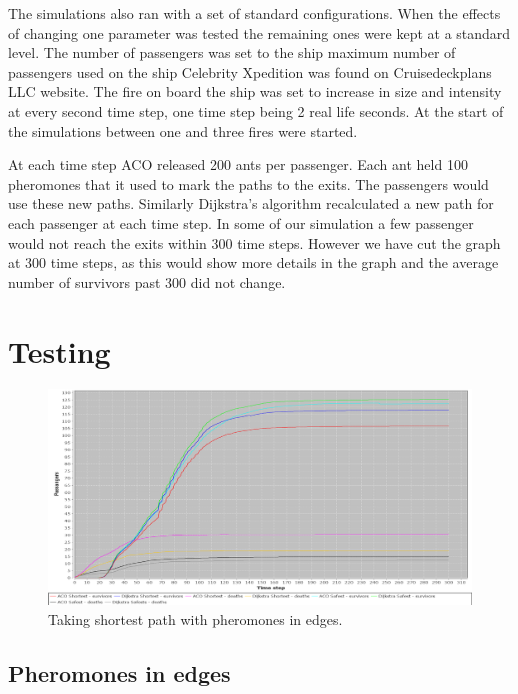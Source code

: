 The simulations also ran with a set of standard configurations. When the effects of changing one parameter was tested the remaining ones were kept at a standard level. The number of passengers was set to the ship maximum number of passengers used on the ship Celebrity Xpedition was found on Cruisedeckplans LLC website\cite{cruseships}. The fire on board the ship was set to increase in size and intensity at every second time step, one time step being 2 real life seconds. At the start of the simulations between one and three fires were started.

At each time step ACO released 200 ants per passenger. Each ant held 100 pheromones that it used to mark the paths to the exits. The passengers would use these new paths. Similarly Dijkstra's algorithm recalculated a new path for each passenger at each time step. In some of our simulation a few passenger would not reach the exits within 300 time steps. However we have cut the graph at 300 time steps, as this would show more details in the graph and the average number of survivors past 300 did not change. 


\section{Testing}

\begin{figure} [h]
\centering
\hspace*{-1.0in}
\includegraphics[scale=0.35]{images/Graph-using-200-rounds-140-passangers-and-ACO-having-pheremons-in-edges.png}
\caption{Taking shortest path with pheromones in edges.}
\label{fig:celebPherInEdge}
\end{figure}
\subsection{Pheromones in edges}

